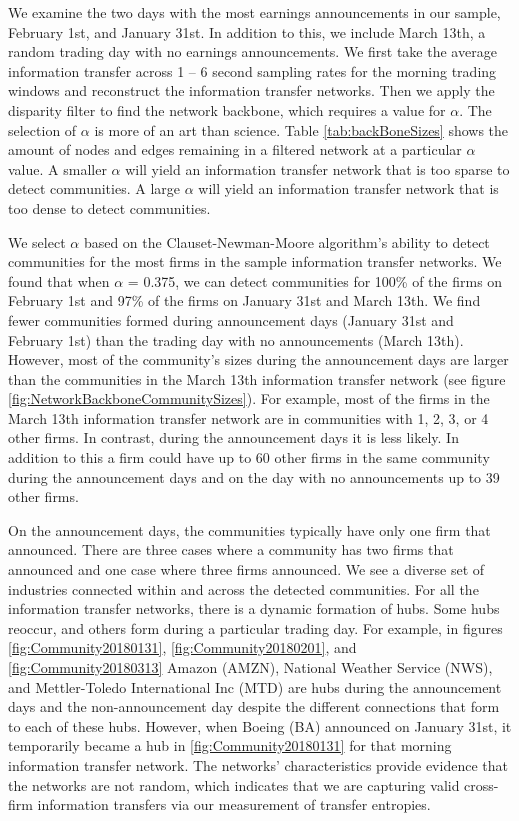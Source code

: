 We examine the two days with the most earnings announcements in our sample,  February 1st, and January 31st. In addition to this,  we include March 13th,  a random trading day with no earnings  announcements.  We first take the average information transfer across 1 – 6 second sampling rates for the morning trading windows and reconstruct the information transfer networks.  Then we apply the disparity filter to find the network backbone, which requires a value for \(\alpha\). The selection of \(\alpha\) is more of an art than science.  Table \ref{tab:backBoneSizes} shows the amount of nodes and edges remaining in a filtered network at a particular  \(\alpha\) value.  A smaller \(\alpha\) will yield an information transfer network that is too sparse to detect communities. A large \(\alpha\) will yield an information transfer network that is too dense to detect communities. 

We select \(\alpha\) based on the Clauset-Newman-Moore algorithm’s ability to detect communities for the most firms in the sample information transfer networks.  We found that when \(\alpha\) = 0.375,  we can detect communities for 100\% of the firms on February 1st and 97\% of the firms on January 31st and March 13th.  We find fewer communities formed during announcement days (January 31st and February 1st) than the trading day with no announcements (March 13th).  However,  most of the community’s sizes during the announcement days are larger than the communities in the March 13th information transfer network (see figure \ref{fig:NetworkBackboneCommunitySizes}).  For example,  most of the firms in the March 13th information transfer network are in communities with 1, 2, 3, or 4 other firms.  In contrast, during the announcement days it is less likely.  In addition to this a firm could have up to 60 other firms in the same community during the announcement days and on the day with no announcements up to 39 other firms.

On the announcement days, the communities typically have only one firm that announced.  There are three cases where a community has two firms that announced and one case where three firms announced. We see a diverse set of industries connected within and across the detected communities.  For all the information transfer networks, there is a dynamic formation of hubs.  Some hubs reoccur, and others form during a particular trading day.  For example,  in figures \ref{fig:Community20180131},  \ref{fig:Community20180201}, and \ref{fig:Community20180313} Amazon (AMZN), National Weather Service (NWS), and Mettler-Toledo International Inc (MTD) are hubs during the announcement days and the non-announcement day despite the different connections that form to each of these hubs.  However, when Boeing (BA) announced on January 31st, it temporarily became a hub in \ref{fig:Community20180131} for that morning information transfer network. The networks' characteristics provide evidence that the networks are not random, which indicates that we are capturing valid cross-firm information transfers via our measurement of transfer entropies. 


